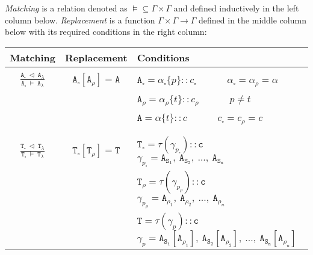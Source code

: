 \documentclass{entcs}
\renewcommand{\~}[0]{\texttildelow}
\begin{document}
\begin{defn} \label{repla}
$ $ \\
\emph{Matching} is a relation denoted as $\models \subseteq \Gamma \times \Gamma$ and defined inductively in the left column below.
    \emph{Replacement} is a function $\Gamma \times \Gamma \rightarrow \Gamma$ defined in the middle column below with its required conditions in the right column:

    \begin{center}
{\scriptsize
\begin{tabular}{ c | | c | l }
	Matching & Replacement & Conditions \\

	\hline
	& & \\[0.02cm]

    $ \frac{\mathtt{A}_{\square}~\lhd~\mathtt{A}_{\lambda}}{\mathtt{A}_{\square}~\models~\mathtt{A}_{\lambda}}$ & 
    $ \mathtt{A}_{\square}[\mathtt{A}_\rho] = \mathtt{A} $ & 
    $ \mathtt{A}_{\square} = \alpha_{\square}\{p\}::c_{\square}$ ~~~~~ $ \alpha_{\square} = \alpha_\rho = \alpha$ \\

     &  & $\mathtt{A}_\rho = \alpha_\rho\{t\}::c_\rho$ ~~~~~ $p \neq t$ \\
     &  & $\mathtt{A} = \alpha\{t\}::c$ ~~~~~ $ c_{\square} = c_\rho = c$\\

    & & \\[0.02cm]
    \hline
    & & \\[0.02cm]

    $\frac{\mathtt{T}_{\square}~\lhd~\mathtt{T}_{\lambda}}{\mathtt{T}_{\square}~\models~\mathtt{T}_{\lambda}}$ & 
    $ \mathtt{T}_{\square}[\mathtt{T}_\rho] = \mathtt{T} $ & 
    $ \mathtt{T}_{\square} = \tau(\gamma_{p_{\square}})::\mathtt{c}$ ~~~~~ $ \gamma_{p_{\square}} = \mathtt{A}_\mathtt{S_1},~ \mathtt{A}_\mathtt{S_2},~ ..., ~\mathtt{A}_\mathtt{S_n} $\\

     &  & $ \mathtt{T}_\rho = \tau(\gamma_{p_\rho})::\mathtt{c}$ ~~~~~ $ \gamma_{p_\rho} = \mathtt{A}_{\rho_1}, ~\mathtt{A}_{\rho_2}, ~..., ~\mathtt{A}_{\rho_n} $ \\
     &  & $\mathtt{T} = \tau(\gamma_{p})::\mathtt{c} $ ~~~~~ $\gamma_{p} = \mathtt{A}_\mathtt{S_1}[\mathtt{A}_{\rho_1}],~\mathtt{A}_\mathtt{S_2}[\mathtt{A}_{\rho_2}],~... ,~\mathtt{A}_\mathtt{S_n}[\mathtt{A}_{\rho_n}]$ \\


\end{tabular}}
\end{center}
\end{defn}
\end{document}
